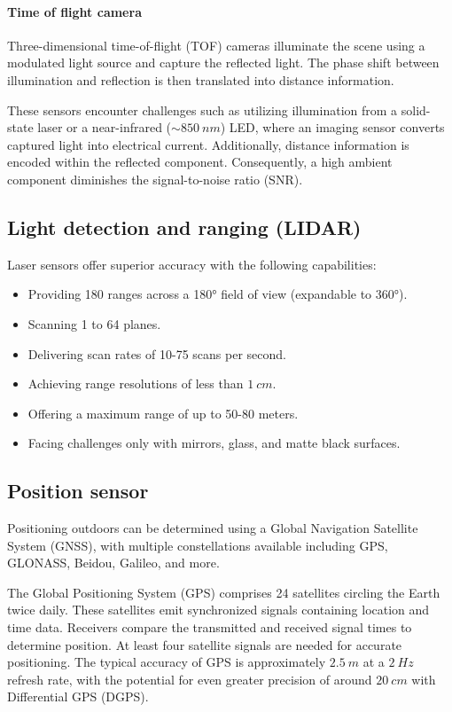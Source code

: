 \paragraph*{Time of flight camera}
Three-dimensional time-of-flight (TOF) cameras illuminate the scene using a modulated light source and capture the reflected light. 
The phase shift between illumination and reflection is then translated into distance information.

These sensors encounter challenges such as utilizing illumination from a solid-state laser or a near-infrared ($\sim 850 \: nm$) LED, where an imaging sensor converts captured light into electrical current. 
Additionally, distance information is encoded within the reflected component. 
Consequently, a high ambient component diminishes the signal-to-noise ratio (SNR).

\subsection{Light detection and ranging (LIDAR)}
Laser sensors offer superior accuracy with the following capabilities:
\begin{itemize}
    \item Providing 180 ranges across a 180° field of view (expandable to 360°).
    \item Scanning 1 to 64 planes.
    \item Delivering scan rates of 10-75 scans per second.
    \item Achieving range resolutions of less than $1\:cm$.
    \item Offering a maximum range of up to 50-80 meters.
    \item Facing challenges only with mirrors, glass, and matte black surfaces.
\end{itemize}

\subsection{Position sensor}
Positioning outdoors can be determined using a Global Navigation Satellite System (GNSS), with multiple constellations available including GPS, GLONASS, Beidou, Galileo, and more.

The Global Positioning System (GPS) comprises 24 satellites circling the Earth twice daily. 
These satellites emit synchronized signals containing location and time data.
Receivers compare the transmitted and received signal times to determine position.
At least four satellite signals are needed for accurate positioning.
The typical accuracy of GPS is approximately $2.5\:m$ at a $2\:Hz$ refresh rate, with the potential for even greater precision of around $20\:cm$ with Differential GPS (DGPS).

